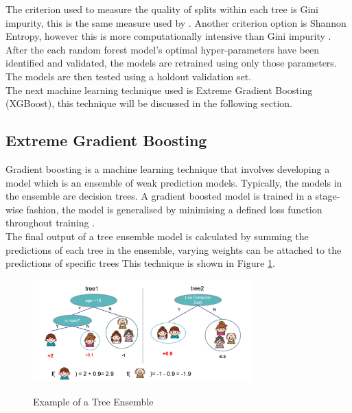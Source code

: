 The criterion used to measure the quality of splits within each tree is Gini impurity, this is the same measure used by \textcite{DecTreesZekic}. Another criterion option is Shannon Entropy, however this is more computationally intensive than Gini impurity \parencite{Gini}. \\

After the each random forest model's optimal hyper-parameters have been identified and validated, the models are retrained using only those parameters. The models are then tested using a holdout validation set. \\

The next machine learning technique used is Extreme Gradient Boosting (XGBoost), this technique will be discussed in the following section. 

\subsection{Extreme Gradient Boosting}

Gradient boosting is a machine learning technique that involves developing a model which is an ensemble of weak prediction models. Typically, the models in the ensemble are decision trees. A gradient boosted model is trained in a stage-wise fashion, the model is generalised by minimising a defined loss function throughout training \parencite{Boosting}.   \\

The final output of a tree ensemble model is calculated by summing the predictions of each tree in the ensemble, varying weights can be attached to the predictions of specific trees This technique is shown in Figure \ref{fig:tree_ens}. \\

\vspace{10 pt}

\begin{figure}[!htb]
\centering
\includegraphics[width=0.75\textwidth]{images/tree_ensemble.png}
\caption{Example of a Tree Ensemble}
\label{fig:tree_ens}
\parencite{XGBoost}
\end{figure}

